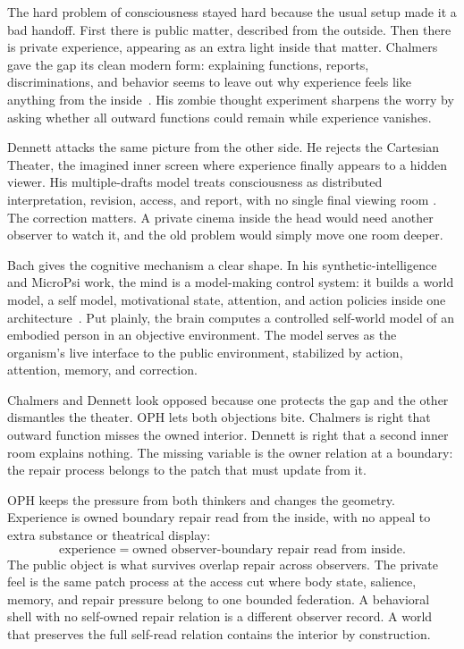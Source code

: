 \documentclass[11pt]{article}
\theoremstyle{remark}
\theoremstyle{plain}
\begin{document}
The hard problem of consciousness stayed hard because the usual setup made it
a bad handoff. First there is public matter, described from the outside. Then
there is private experience, appearing as an extra light inside that matter.
Chalmers gave the gap its clean modern form: explaining functions, reports,
discriminations, and behavior seems to leave out why experience feels like
anything from the inside~\cite{Chalmers1995}. His zombie thought experiment
sharpens the worry by asking whether all outward functions could remain while
experience vanishes.

Dennett attacks the same picture from the other side. He rejects the Cartesian
Theater, the imagined inner screen where experience finally appears to a hidden
viewer. His multiple-drafts model treats consciousness as distributed
interpretation, revision, access, and report, with no single final viewing room
\cite{Dennett1991}. The correction matters. A private cinema inside the
head would need another observer to watch it, and the old problem would simply
move one room deeper.

Bach gives the cognitive mechanism a clear shape. In his synthetic-intelligence
and MicroPsi work, the mind is a model-making control system: it builds a world
model, a self model, motivational state, attention, and action policies inside
one architecture~\cite{Bach2009,BachMicroPsi2006}. Put plainly, the brain
computes a controlled self-world model of an embodied person in an
objective environment. The model serves as the organism's live interface to the
public environment,
stabilized by action, attention, memory, and correction.

Chalmers and Dennett look opposed because one protects the gap and the other
dismantles the theater. OPH lets both objections bite. Chalmers is right that
outward function misses the owned interior. Dennett is right that a second
inner room explains nothing. The missing variable is the owner relation at a
boundary: the repair process belongs to the patch that must update from it.

OPH keeps the pressure from both thinkers and changes the geometry. Experience
is owned boundary repair read from the inside, with no appeal to extra substance
or theatrical display:
\[
\boxed{
\text{experience}=\text{owned observer-boundary repair read from inside}.
}
\]
The public object is what survives overlap repair across observers. The private
feel is the same patch process at the access cut where body state, salience,
memory, and repair pressure belong to one bounded federation. A behavioral shell
with no self-owned repair relation is a different observer record. A world that
preserves the full self-read relation contains the interior by construction.
\end{document}
